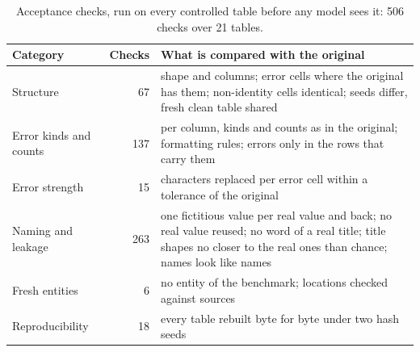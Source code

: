 \begin{table}[t]
  \caption{Acceptance checks, run on every controlled table before any model sees it: 506 checks over 21 tables.}
  \label{tab:checks}
  \small
  \setlength{\tabcolsep}{3pt}
  \begin{tabularx}{\columnwidth}{@{}>{\raggedright\arraybackslash}p{}r>{\raggedright\arraybackslash}X@{}}
    \toprule
    Category & Checks & What is compared with the original \\
    \midrule
    Structure & 67 & shape and columns; error cells where the original has them; non-identity cells identical; seeds differ, fresh clean table shared \\
    Error kinds and counts & 137 & per column, kinds and counts as in the original; formatting rules; errors only in the rows that carry them \\
    Error strength & 15 & characters replaced per error cell within a tolerance of the original \\
    Naming and leakage & 263 & one fictitious value per real value and back; no real value reused; no word of a real title; title shapes no closer to the real ones than chance; names look like names \\
    Fresh entities & 6 & no entity of the benchmark; locations checked against sources \\
    Reproducibility & 18 & every table rebuilt byte for byte under two hash seeds \\
    \bottomrule
  \end{tabularx}
\end{table}
